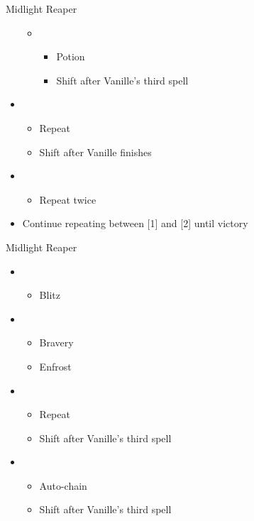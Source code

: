 \begin{paracol}{2}
\begin{battle}{Midlight Reaper}
\begin{itemize}
\begin{itemize}
\begin{itemize}
				            \end{itemize}
				      \item \sixth
				            \begin{itemize}
					            \item Potion
					            \item Shift after Vanille's third spell
				            \end{itemize}
			      \end{itemize}
			\item \first
			      \begin{itemize}
				      \item Repeat
				      \item Shift after Vanille finishes
			      \end{itemize}
			\item \second
			      \begin{itemize}
				      \item Repeat twice
			      \end{itemize}
			\item Continue repeating between [1] and [2] until victory
		\end{itemize}
	\end{battle}
	\switchcolumn
	\begin{battle}{Midlight Reaper}
		\begin{itemize}
			\item \first
			      \begin{itemize}
				      \item Blitz
			      \end{itemize}
			\item \third
			      \begin{itemize}
				      \item Bravery
				      \item Enfrost
			      \end{itemize}
			\item \sixth
			      \begin{itemize}
				      \item Repeat
				      \item Shift after Vanille's third spell
			      \end{itemize}
			\item \fifth
			      \begin{itemize}
				      \item Auto-chain
				      \item Shift after Vanille's third spell

\end{itemize}
\end{itemize}
\end{battle}
\end{paracol}
